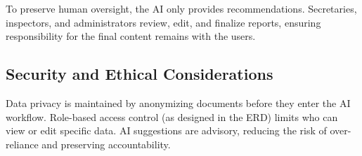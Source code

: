 To preserve human oversight, the AI only provides recommendations. Secretaries, inspectors, and administrators review, edit, and finalize reports, ensuring responsibility for the final content remains with the users.

\subsection{Security and Ethical Considerations}
Data privacy is maintained by anonymizing documents before they enter the AI workflow. Role-based access control (as designed in the ERD) limits who can view or edit specific data. AI suggestions are advisory, reducing the risk of over-reliance and preserving accountability.